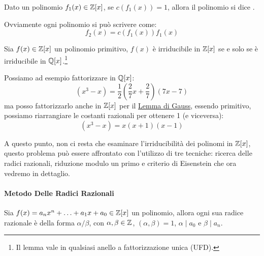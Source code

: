\documentclass[11pt]{scrartcl}
\begin{document}
\begin{definition}
Dato un polinomio $f_1(x) \in \mathbb Z[x]$, se $c(f_1(x)) = 1$, allora il polinomio si dice .
\end{definition}

Ovviamente ogni polinomio si può scrivere come:
	\[ f_2(x) = c(f_1(x))f_1(x)
	\]

\begin{lemma}
\label{p:Gauss}
Sia $f(x) \in \mathbb Z[x]$ un polinomio primitivo, $f(x)$ è irriducibile in $\mathbb Z[x]$ se e solo se è irriducibile in $\mathbb Q[x]$.\footnote{Il lemma vale in qualsiasi anello a fattorizzazione unica (UFD).}
\end{lemma}

\begin{example}
Possiamo ad esempio fattorizzare in $\mathbb Q[x]$:
	\[ (x^3 - x) = \frac 12\left(\frac 27x + \frac 27 \right) (7x -7)
	\]
ma posso fattorizzarlo anche in $\mathbb Z[x]$ per il \hyperref[p:Gauss]{Lemma di Gauss}, essendo primitivo, possiamo riarrangiare le costanti razionali per ottenere 1 (e viceversa):
	\[ (x^3 - x) = x(x+1)(x-1)
	\]
\end{example}

A questo punto, non ci resta che esaminare l'irriducibilità dei polinomi in $\mathbb Z[x]$, questo problema può essere affrontato con l'utilizzo di tre tecniche: ricerca delle radici razionali, riduzione modulo un primo e criterio di Eisenstein che ora vedremo in dettaglio.

\paragraph{Metodo Delle Radici Razionali}
\begin{theorem}
Sia $f(x) = a_nx^n + \ldots + a_1x + a_0 \in \mathbb Z[x]$ un polinomio, allora ogni sua radice razionale è della forma $\alpha/\beta$, con $\alpha,\beta \in \mathbb Z$, $(\alpha,\beta) = 1$, $\alpha \mid a_0$ e $\beta \mid a_n$.
\end{theorem}
\end{document}

